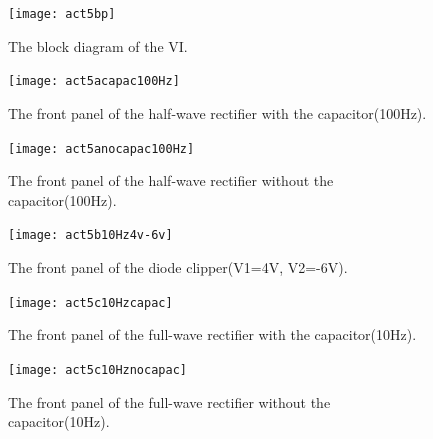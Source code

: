 \documentclass[11pt]{article}
\begin{document}
\begin{figure}[H]
 \begin{center}
  \texttt{[image: act5bp]}
  \caption{The block diagram of the VI.}
  \label{fig:act3bp}
 \end{center}
\end{figure}

\begin{figure}[H]
 \begin{center}
  \texttt{[image: act5acapac100Hz]}
  \caption{The front panel of the half-wave rectifier with the capacitor(100Hz).}
  \label{fig:act5acapac100Hz}
 \end{center}
\end{figure}

\begin{figure}[H]
 \begin{center}
  \texttt{[image: act5anocapac100Hz]}
  \caption{The front panel of the half-wave rectifier without the capacitor(100Hz).}
  \label{fig:act5anocapac100Hz}
 \end{center}
\end{figure}

\begin{figure}[H]
 \begin{center}
  \texttt{[image: act5b10Hz4v-6v]}
  \caption{The front panel of the diode clipper(V1=4V, V2=-6V).}
  \label{fig:act5b10Hz4v-6v}
 \end{center}
\end{figure}

\begin{figure}[H]
 \begin{center}
  \texttt{[image: act5c10Hzcapac]}
  \caption{The front panel of the full-wave rectifier with the capacitor(10Hz).}
  \label{fig:act5c10Hzcapac}
 \end{center}
\end{figure}

\begin{figure}[H]
 \begin{center}
  \texttt{[image: act5c10Hznocapac]}
  \caption{The front panel of the full-wave rectifier without the capacitor(10Hz).}
  \label{fig:act5c10Hznocapac}
 \end{center}
\end{figure}
\end{document}
